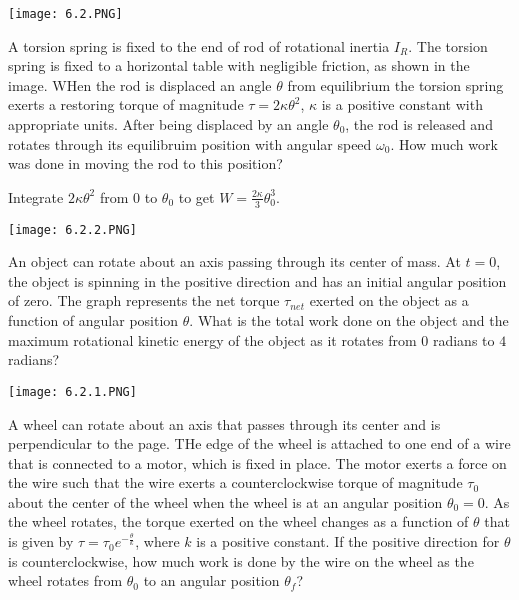\documentclass[../mech.tex]{subfiles}
\begin{document}
\begin{example}
    \begin{center}
        \texttt{[image: 6.2.PNG]}
    \end{center}
    A torsion spring is fixed to the end of rod of rotational inertia $I_R$. The torsion spring is fixed to a horizontal table with negligible friction, as shown in the image. WHen the rod is displaced an angle $\theta$ from equilibrium 
    the torsion spring exerts a restoring torque of magnitude $\tau = 2\kappa \theta^2$, $\kappa$ is a positive constant with appropriate units. After being displaced by an angle $\theta_0$, the rod is released and rotates through its equilibruim position with angular speed 
    $\omega_0$. How much work was done in moving the rod to this position?

    Integrate $2\kappa\theta^2$ from $0$ to $\theta_0$ to get $W=\frac{2\kappa}{3}\theta_0^3$.
\end{example}

\ex \begin{center}
    \texttt{[image: 6.2.2.PNG]}
\end{center}
An object can rotate about an axis passing through its center of mass. At $t=0$, the object is spinning in the positive direction and has an initial angular position of zero. The graph represents the net torque $\tau_{net}$ exerted on the object as a function of angular position $\theta$.
What is the total work done on the object and the maximum rotational kinetic energy of the object as it rotates from $0$ radians to $4$ radians?

\ex \begin{center}
    \texttt{[image: 6.2.1.PNG]}
\end{center}
A wheel can rotate about an axis that passes through its center and is perpendicular to the page. THe edge of the wheel is attached to one end of a wire that is connected to a motor, which is fixed in place.
The motor exerts a force on the wire such that the wire exerts a counterclockwise torque of magnitude $\tau_0$ about the center of the wheel when the wheel is at an angular position $\theta_0=0$. As the wheel rotates,
the torque exerted on the wheel changes as a function of $\theta$ that is given by $\tau = \tau_0 e^{-\frac{\theta}{k}}$, where $k$ is a positive constant. If the positive direction for $\theta$ is counterclockwise, how much work is done by the wire 
on the wheel as the wheel rotates from $\theta_0$ to an angular position $\theta_f$?
\end{document}
